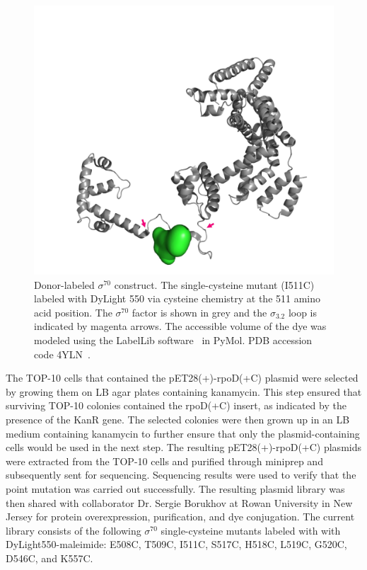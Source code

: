 \begin{figure}
    \centering
    \includegraphics[width=\textwidth]{chapters/figures/sigma_3-2_loop_donor-dye.jpg}
    \caption{\label{fig:sigma_3-2_loop_donor-dye} 
    Donor-labeled $\sigma^{70}$ construct.
    The single-cysteine mutant (I511C) labeled with DyLight 550 via cysteine chemistry at the 511 amino acid position.
    The $\sigma^{70}$ factor is shown in grey and the $\sigma_{3.2}$ loop is indicated by magenta arrows.
    The accessible volume of the dye was modeled using the LabelLib software~\cite{dimura_NatComm_2020} in PyMol.
    PDB accession code 4YLN~\cite{zuo_steitz_2015}.
    }
\end{figure}

The TOP-10 cells that contained the pET28(+)-rpoD(+C) plasmid were selected by growing them on LB agar plates containing kanamycin. 
This step ensured that surviving TOP-10 colonies contained the rpoD(+C) insert, as indicated by the presence of the KanR gene. 
The selected colonies were then grown up in an LB medium containing kanamycin to further ensure that only the plasmid-containing cells would be used in the next step. 
The resulting pET28(+)-rpoD(+C) plasmids were extracted from the TOP-10 cells and purified through miniprep and subsequently sent for sequencing.
Sequencing results were used to verify that the point mutation was carried out successfully. 
The resulting plasmid library was then shared with collaborator Dr. Sergie Borukhov at Rowan University in New Jersey for protein overexpression, purification, and dye conjugation.
The current library consists of the following $\sigma^{70}$ single-cysteine mutants labeled with with DyLight550-maleimide: E508C, T509C, I511C, S517C, H518C, L519C, G520C, D546C, and K557C.

